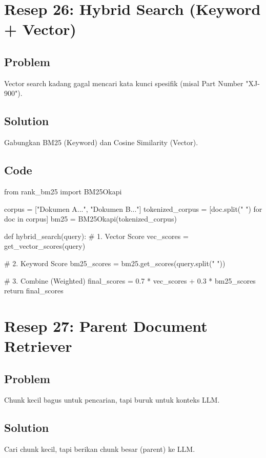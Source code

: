 \newpage

\section{Resep 26: Hybrid Search (Keyword + Vector)}

\subsection*{Problem}
Vector search kadang gagal mencari kata kunci spesifik (misal Part Number "XJ-900").

\subsection*{Solution}
Gabungkan BM25 (Keyword) dan Cosine Similarity (Vector).

\subsection*{Code}
\begin{codeblock}[language=Python]
from rank_bm25 import BM25Okapi

corpus = ["Dokumen A...", "Dokumen B..."]
tokenized_corpus = [doc.split(" ") for doc in corpus]
bm25 = BM25Okapi(tokenized_corpus)

def hybrid_search(query):
    # 1. Vector Score
    vec_scores = get_vector_scores(query)

    # 2. Keyword Score
    bm25_scores = bm25.get_scores(query.split(" "))

    # 3. Combine (Weighted)
    final_scores = 0.7 * vec_scores + 0.3 * bm25_scores
    return final_scores
\end{codeblock}

\newpage

\section{Resep 27: Parent Document Retriever}

\subsection*{Problem}
Chunk kecil bagus untuk pencarian, tapi buruk untuk konteks LLM.

\subsection*{Solution}
Cari chunk kecil, tapi berikan chunk besar (parent) ke LLM.


